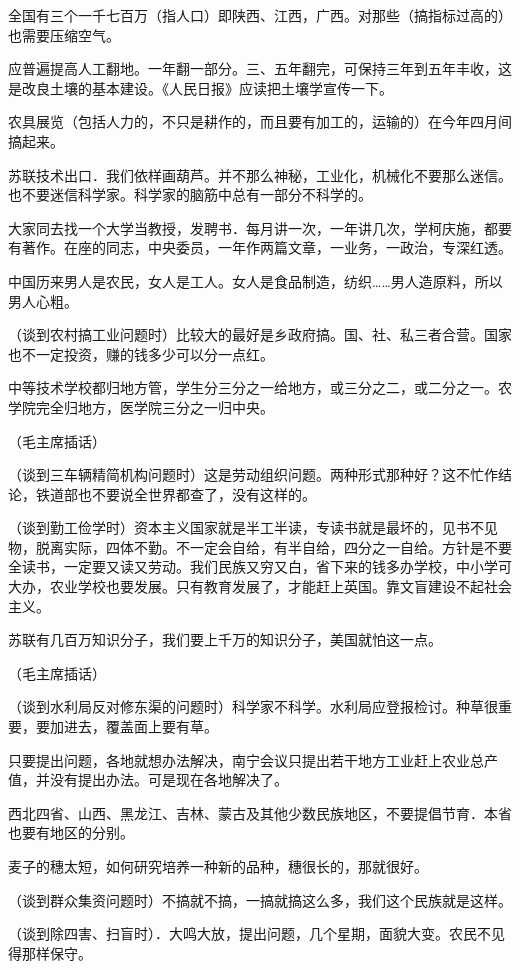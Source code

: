 全国有三个一千七百万（指人口）即陕西、江西，广西。对那些（搞指标过高的）也需要压缩空气。

应普遍提高人工翻地。一年翻一部分。三、五年翻完，可保持三年到五年丰收，这是改良土壤的基本建设。《人民日报》应读把土壤学宣传一下。

农具展览（包括人力的，不只是耕作的，而且要有加工的，运输的）在今年四月间搞起来。

苏联技术出口．我们依样画葫芦。并不那么神秘，工业化，机械化不要那么迷信。也不要迷信科学家。科学家的脑筋中总有一部分不科学的。

大家同去找一个大学当教授，发聘书．每月讲一次，一年讲几次，学柯庆施，都要有著作。在座的同志，中央委员，一年作两篇文章，一业务，一政治，专深红透。

中国历来男人是农民，女人是工人。女人是食品制造，纺织……男人造原料，所以男人心粗。

（谈到农村搞工业问题时）比较大的最好是乡政府搞。国、社、私三者合营。国家也不一定投资，赚的钱多少可以分一点红。

中等技术学校都归地方管，学生分三分之一给地方，或三分之二，或二分之一。农学院完全归地方，医学院三分之一归中央。

（毛主席插话）

（谈到三车辆精简机构问题时）这是劳动组织问题。两种形式那种好？这不忙作结论，铁道部也不要说全世界都查了，没有这样的。

（谈到勤工俭学时）资本主义国家就是半工半读，专读书就是最坏的，见书不见物，脱离实际，四体不勤。不一定会自给，有半自给，四分之一自给。方针是不要全读书，一定要又读又劳动。我们民族又穷又白，省下来的钱多办学校，中小学可大办，农业学校也要发展。只有教育发展了，才能赶上英国。靠文盲建设不起社会主义。

苏联有几百万知识分子，我们要上千万的知识分子，美国就怕这一点。

（毛主席插话）

（谈到水利局反对修东渠的问题时）科学家不科学。水利局应登报检讨。种草很重要，要加进去，覆盖面上要有草。

只要提出问题，各地就想办法解决，南宁会议只提出若干地方工业赶上农业总产值，并没有提出办法。可是现在各地解决了。

西北四省、山西、黑龙江、吉林、蒙古及其他少数民族地区，不要提倡节育．本省也要有地区的分别。

麦子的穗太短，如何研究培养一种新的品种，穗很长的，那就很好。

（谈到群众集资问题时）不搞就不搞，一搞就搞这么多，我们这个民族就是这样。

（谈到除四害、扫盲时）．大鸣大放，提出问题，几个星期，面貌大变。农民不见得那样保守。




